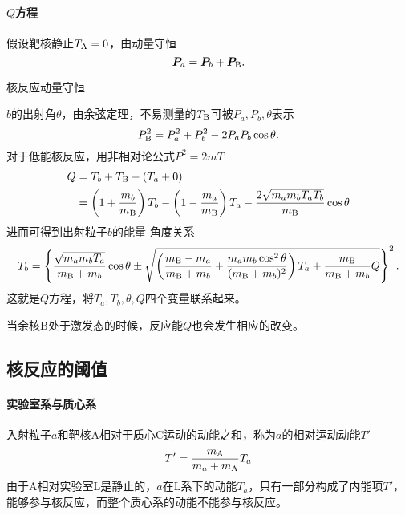 \paragraph{$Q$方程}假设靶核静止$T_{\mathrm{A}}=0$，由动量守恒
\[
	\bm P_a=\bm P_b+\bm P_{\mathrm{B}}.
\]
\begin{center}
	\tikzchap 核反应动量守恒
\end{center}
$b$的出射角$\theta$，由余弦定理，不易测量的$T_{\mathrm{B}}$可被$P_a,P_b,\theta$表示
\[
	P_{\mathrm{B}}^2=P_a^2+P_b^2-2P_aP_b\cos\theta.
\]
对于低能核反应，用非相对论公式$P^2=2mT$
\begin{align}\notag
	Q&=T_b+T_{\mathrm{B}}-(T_a+0)\\
	&=\left(1+\frac{m_b}{m_{\mathrm{B}}}\right)T_b-\left(1-\frac{m_a}{m_{\mathrm{B}}}\right)T_a-\frac{2\sqrt{m_am_bT_aT_b}}{m_{\mathrm{B}}}\cos\theta
\end{align}
进而可得到出射粒子$b$的能量-角度关系
{\small\begin{align}
	T_b=\left\{\frac{\sqrt{m_am_bT_a}}{m_{\mathrm{B}}+m_b}\cos\theta\pm\sqrt{\left(\frac{m_{\mathrm{B}}-m_a}{m_{\mathrm{B}}+m_b}+\frac{m_am_b\cos^2\theta}{(m_{\mathrm{B}}+m_b)^2}\right)T_a+\frac{m_{\mathrm{B}}}{m_{\mathrm{B}}+m_b}Q}\right\}^2.
\end{align}}
这就是$Q$方程，将$T_a,T_b,\theta,Q$四个变量联系起来。

当余核B处于激发态的时候，反应能$Q$也会发生相应的改变。

\subsection{核反应的阈值}
\paragraph{实验室系与质心系}
入射粒子$a$和靶核A相对于质心C运动的动能之和，称为$a$的相对运动动能$T'$
\begin{align}
	T'=\frac{m_{\mathrm{A}}}{m_a+m_{\mathrm{A}}}T_a
\end{align}
由于A相对实验室L是静止的，$a$在L系下的动能$T_a$，只有一部分构成了内能项$T'$，能够参与核反应，而整个质心系的动能不能参与核反应。

